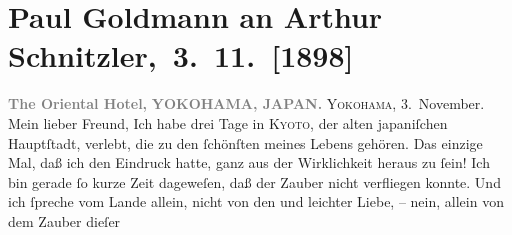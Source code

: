 

         
         \renewcommand{\erwaehntePersonen}{Personen: Paul Goldmann, Marie Reinhard}
         \renewcommand{\erwaehnteOrte}{Orte: Japan, Kyoto, The Oriental Hotel, Wien, Yokohama}
         \renewcommand{\erwaehnteWerke}{}
               \section[ Paul Goldmann an Arthur Schnitzler, 3. 11. {[}1898{]}]{ Paul Goldmann an Arthur Schnitzler, 3. 11. {[}1898{]}}\nopagebreak{}\rehead{ }\begin{ledgroupsized}[t]{13cm}\normalsize\beginnumbering{} \toendnotes[C]{\smallbreak\pagebreak[2]} 
\toendnotes[C]{\smallbreak}\pstart
           \noindent{}{\pb}\textcolor{gray}{\textbf{The Oriental Hotel,}}\pend
           \pstart
           \textcolor{gray}{\textbf{YOKOHAMA, JAPAN.}}\pend
           \pstart
           \raggedleft{}\textsc{Yokohama}, 3. November.\pend
           \pstart\center{}Mein lieber Freund,\pend\pstart
           Ich habe drei Tage in \textsc{Kyoto}, der alten japaniſchen Hauptſtadt, verlebt, die zu den ſchönſten
               meines Lebens gehören. Das einzige Mal, daß ich den Eindruck hatte, ganz aus der
               Wirklichkeit heraus zu ſein! Ich bin gerade ſo kurze Zeit dageweſen, daß der Zauber
               nicht verfliegen konnte. Und ich ſpreche vom Lande allein,  nicht von den \label{K_L02864-1v}\label{K_L02864-1h} und leichter Liebe, – nein, allein von dem Zauber dieſer

\end{ledgroupsized}
